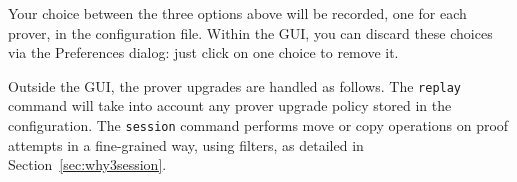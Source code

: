 Your choice between the three options above will be recorded, one for
each prover, in the \why configuration file. Within the GUI, you can
discard these choices via the \textsf{Preferences} dialog: just click on one choice to remove it.

Outside the GUI, the prover upgrades are handled as follows. The
\texttt{replay} command will take into account any prover upgrade policy stored in the configuration.
The \texttt{session} command performs move or copy operations on
proof attempts in a fine-grained way, using filters, as detailed in
Section~\ref{sec:why3session}.




